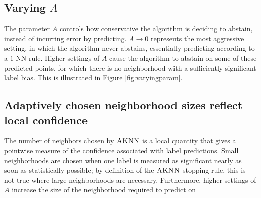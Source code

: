 \documentclass{article}
\newcommand{\algname}{\textsc{AKNN}}
\begin{document}
\subsection{Varying $A$}

The parameter $A$ controls how conservative the algorithm is deciding to abstain, instead of incurring error by predicting. $A \to 0$ represents the most aggressive setting, in which the algorithm never abstains, essentially predicting according to a $1$-NN rule. Higher settings of $A$ cause the algorithm to abstain on some of these predicted points, for which there is no neighborhood with a sufficiently significant label bias. This is illustrated in Figure \ref{fig:varyingparam}.



\subsection{Adaptively chosen neighborhood sizes reflect local confidence}

The number of neighbors chosen by $\algname$ is a local quantity that gives a pointwise measure of the confidence associated with label predictions. Small neighborhoods are chosen when one label is measured as significant nearly as soon as statistically possible; by definition of the $\algname$ stopping rule, this is not true where large neighborhoods are necessary. Furthermore, higher settings of $A$ increase the size of the neighborhood required to predict on 
\end{document}
